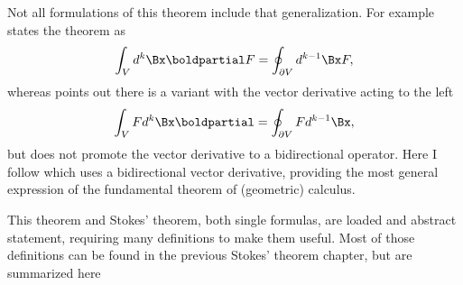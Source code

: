 %
%
Not all formulations of this theorem include that generalization.
For example \citep{aMacdonaldVAGC} states the theorem as
\begin{dmath}\label{eqn:fundamentalTheoremOfCalculus:180}
\int_V d^k \Bx \boldpartial F = \oint_{\partial V} d^{k-1} \Bx F,
\end{dmath}
whereas \citep{doran2003gap} points out there is a variant with the vector derivative acting to the left
\begin{dmath}\label{eqn:fundamentalTheoremOfCalculus:200}
\int_V F d^k \Bx \boldpartial = \oint_{\partial V} F d^{k-1} \Bx,
\end{dmath}
but does not promote the vector derivative to a bidirectional operator.
Here I follow \citep{sobczyk2011fundamental} which uses a bidirectional vector derivative, providing the most general expression of the fundamental theorem of (geometric) calculus.

This theorem and Stokes' theorem, both single formulas, are loaded and abstract statement, requiring many definitions to make them useful.
Most of those definitions can be found in the previous Stokes' theorem chapter, but are summarized here

